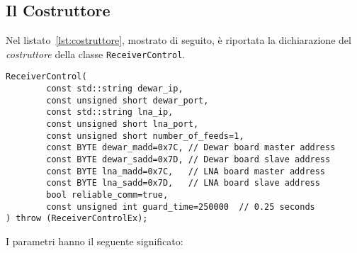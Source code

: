 \subsection{Il Costruttore}
Nel listato~\ref{lst:costruttore}, mostrato di seguito, \`e riportata la dichiarazione del \emph{costruttore} 
della classe \texttt{ReceiverControl}.
\lstset{language=C++}
\begin{lstlisting}[caption={[Dichiarazione del costruttore di \texttt{ReceiverControl}]
Dichiarazione del costruttore della classe \texttt{ReceiverControl}},
label=lst:costruttore,mathescape]
ReceiverControl(
        const std::string dewar_ip,
        const unsigned short dewar_port, 
        const std::string lna_ip, 
        const unsigned short lna_port, 
        const unsigned short number_of_feeds=1,
        const BYTE dewar_madd=0x7C, // Dewar board master address
        const BYTE dewar_sadd=0x7D, // Dewar board slave address
        const BYTE lna_madd=0x7C,   // LNA board master address
        const BYTE lna_sadd=0x7D,   // LNA board slave address
        bool reliable_comm=true,
        const unsigned int guard_time=250000  // 0.25 seconds
) throw (ReceiverControlEx);
\end{lstlisting}
\lstset{numbers=none}
I parametri hanno il seguente significato:
